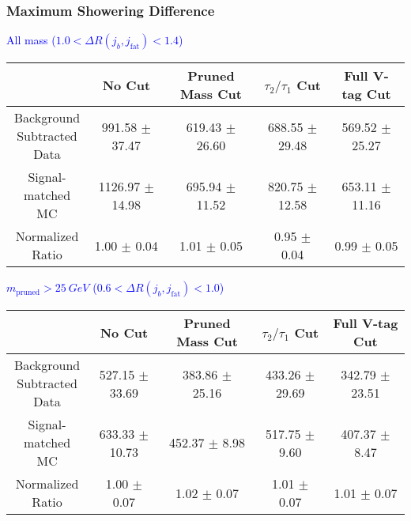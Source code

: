 \documentclass{beamer}
\begin{document}
\begin{frame}
  \frametitle{Maximum Showering Difference}
  \begin{adjustwidth}{-1.5em}{-1.5em}
    \centering
    \vspace{6pt}
    \textcolor{blue}{All mass ($1.0 < \Delta R(j_b,j_\text{fat}) < 1.4$)}
    \vspace{6pt}

    {\scriptsize
      \begin{tabular}{c | c | c | c | c}
        \hline
        & No Cut & Pruned Mass Cut & $\tau_2/\tau_1$ Cut & Full V-tag Cut \\
        \hline
        \makecell{Background \\ Subtracted \\ Data} & 991.58 $\pm$ 37.47 & 619.43 $\pm$ 26.60 & 688.55 $\pm$ 29.48 & 569.52 $\pm$ 25.27 \\
        \makecell{Signal-\\ matched MC} & 1126.97 $\pm$ 14.98 & 695.94 $\pm$ 11.52 & 820.75 $\pm$ 12.58 & 653.11 $\pm$ 11.16 \\
        \hline
        \makecell{Normalized \\ Ratio} & 1.00 $\pm$ 0.04 & 1.01 $\pm$ 0.05 & 0.95 $\pm$ 0.04 & 0.99 $\pm$ 0.05 \\
        \hline
      \end{tabular}
    }

    \vspace{6pt}
    \textcolor{blue}{$m_\text{pruned} > \SI{25}{GeV}$ ($0.6 < \Delta R(j_b,j_\text{fat}) < 1.0$)}
    \vspace{6pt}

    {\scriptsize
      \begin{tabular}{c | c | c | c | c}
        \hline
        & No Cut & Pruned Mass Cut & $\tau_2/\tau_1$ Cut & Full V-tag Cut \\
        \hline
        \makecell{Background \\ Subtracted \\ Data} & 527.15 $\pm$ 33.69 & 383.86 $\pm$ 25.16 & 433.26 $\pm$ 29.69 & 342.79 $\pm$ 23.51 \\
        \makecell{Signal-\\ matched MC} & 633.33 $\pm$ 10.73 & 452.37 $\pm$ 8.98 & 517.75 $\pm$ 9.60 & 407.37 $\pm$ 8.47 \\
        \hline
        \makecell{Normalized \\ Ratio} & 1.00 $\pm$ 0.07 & 1.02 $\pm$ 0.07 & 1.01 $\pm$ 0.07 & 1.01 $\pm$ 0.07 \\
        \hline
      \end{tabular}
    }
  \end{adjustwidth}
\end{frame}
\end{document}
